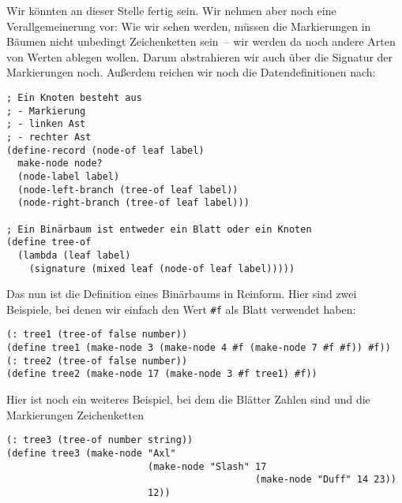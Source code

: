 Wir könnten an dieser Stelle fertig sein.  Wir nehmen aber noch eine
Verallgemeinerung vor: Wie wir sehen werden, müssen die Markierungen
in Bäumen nicht unbedingt Zeichenketten sein~-- wir werden da noch
andere Arten von Werten ablegen wollen.  Darum abstrahieren wir auch
über die Signatur der Markierungen noch.  Außerdem reichen wir noch
die Datendefinitionen nach:
%
\begin{lstlisting}
; Ein Knoten besteht aus
; - Markierung
; - linken Ast
; - rechter Ast
(define-record (node-of leaf label)
  make-node node?
  (node-label label)
  (node-left-branch (tree-of leaf label))
  (node-right-branch (tree-of leaf label)))

; Ein Binärbaum ist entweder ein Blatt oder ein Knoten
(define tree-of
  (lambda (leaf label)
    (signature (mixed leaf (node-of leaf label)))))
\end{lstlisting}
%
Das nun ist die Definition eines Binärbaums in Reinform.  Hier sind
zwei Beispiele, bei denen wir einfach den Wert \lstinline{#f} als
Blatt verwendet haben:
%
\begin{lstlisting}
(: tree1 (tree-of false number))
(define tree1 (make-node 3 (make-node 4 #f (make-node 7 #f #f)) #f))
(: tree2 (tree-of false number))
(define tree2 (make-node 17 (make-node 3 #f tree1) #f))
\end{lstlisting}
%
Hier ist noch ein weiteres Beispiel, bei dem die Blätter Zahlen sind
und die Markierungen Zeichenketten
\begin{lstlisting}
(: tree3 (tree-of number string))
(define tree3 (make-node "Axl"
                         (make-node "Slash" 17 
                                            (make-node "Duff" 14 23))
                         12))
\end{lstlisting}
%

